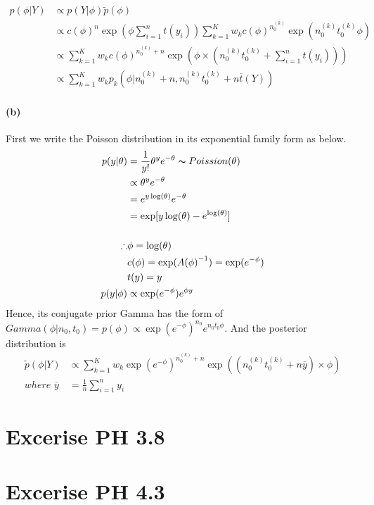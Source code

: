 \documentclass[11pt, letterpaper]{article}
\begin{document}
\begin{align*}
  p(\phi|Y) &\propto p(Y|\phi)\tilde{p}(\phi) \\
    &\propto {c(\phi)}^{n} \exp(\phi \sum_{i=1}^{n} t(y_i)) \sum_{k=1}^{K} w_k {c(\phi)}^{n_0^{(k)}} \exp(n_0^{(k)} t_0^{(k)} \phi) \\
    &\propto \sum_{k=1}^{K} w_k {c(\phi)}^{n_0^{(k)} + n} \exp(\phi \times (n_0^{(k)} t_0^{(k)} + \sum_{i=1}^{n} t(y_i))) \\
    &\propto \sum_{k=1}^{K} w_k p_k(\phi | n_0^{(k)}+n, n_0^{(k)} t_0^{(k)} + n \overline{t}(Y))
\end{align*}

\paragraph{(b)}
First we write the Poisson distribution in its exponential family form as below.
\begin{align*}
  p(y|\theta) &= \frac{1}{y!} \theta^y e^{-\theta} \thicksim Poission(\theta) \\
    &\propto \theta^y e^{-\theta} \\
    &= e^{y \log(\theta)} e^{-\theta} \\
    &= \exp[y\log(\theta) - e^{\log(\theta)}] \\ \\
  \therefore
    & \phi = \log(\theta) \\
    & c(\phi) = \exp({A(\phi)}^{-1}) = \exp(e^{-\phi}) \\
    & t(y) = y \\
  p(y|\phi) &\propto \exp(e^{-\phi}) e^{\phi y}
\end{align*}
Hence, its conjugate prior Gamma has the form of $Gamma(\phi|n_0, t_0) = p(\phi) \propto \exp(e^{-\phi})^{n_0} e^{n_0 t_0 \phi}$.
And the posterior distribution is
\begin{align*}
  \tilde{p}(\phi|Y) &\propto \sum_{k=1}^{K} w_k {\exp(e^{-\phi})}^{n_0^{(k)}+n} \exp((n_0^{(k)} t_0^{(k)} + n\overline{y}) \times \phi) \\
  where \,\, \overline{y} &= \frac{1}{n} \sum_{i=1}^{n} y_i
\end{align*}
\newpage


\section{Excerise PH 3.8}
\newpage


\section{Excerise PH 4.3}
\end{document}
